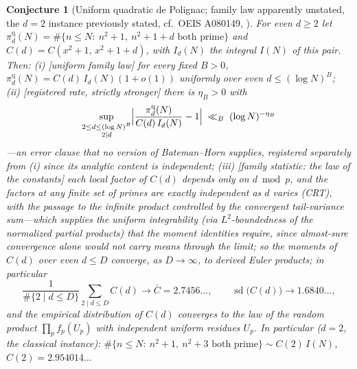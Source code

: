 \documentclass[11pt]{article}
\newtheorem{conjecture}{Conjecture}
\theoremstyle{definition}
\begin{document}
\setcounter{conjecture}{9}%
\begin{conjecture}[Uniform quadratic de Polignac; family law apparently
unstated, the $d=2$ instance previously stated, cf.\ OEIS A080149,
\cite{Carella}]\label{c1}
For even $d\ge2$ let
$\pi^{\mathrm q}_d(N)=\#\{n\le N:\ n^2+1,\ n^2+1+d \text{ both
prime}\}$ and $C(d)=C(x^2+1,\,x^2+1+d)$, with $I_d(N)$ the integral $I(N)$ of this pair.  Then:
\emph{(i)} [uniform family law] for every fixed $B>0$,
$\pi^{\mathrm q}_d(N)=C(d)\,I_d(N)(1+o(1))$ uniformly over even
$d\le(\log N)^{B}$;
\emph{(ii)} [registered rate, strictly stronger] there is
$\eta_B>0$ with
\[
\sup_{\substack{2\le d\le(\log N)^{B}\\ 2\mid d}}
\Bigl|\frac{\pi^{\mathrm q}_d(N)}{C(d)\,I_d(N)}-1\Bigr|
\;\ll_B\;(\log N)^{-\eta_B}
\]
---an error clause that no version of Bateman--Horn supplies, registered
separately from (i) since its analytic content is independent;
\emph{(iii)} [family statistic: the law of the constants]
each local factor of $C(d)$ depends only on $d\bmod p$, and the
factors at any \emph{finite} set of primes are exactly independent
as $d$ varies (CRT), with the passage to the infinite product
controlled by the convergent tail-variance sum---which supplies the
uniform integrability (via $L^2$-boundedness of the normalized
partial products) that the moment identities require, since
almost-sure convergence alone would not carry means through the
limit; so the moments of
$C(d)$ over even $d\le D$ converge, as $D\to\infty$, to
\emph{derived} Euler products; in particular
\[
\frac1{\#\{2\mid d\le D\}}\sum_{2\mid d\le D}C(d)\to\bar C=2.7456\ldots,
\qquad
\operatorname{sd}\bigl(C(d)\bigr)\to1.6840\ldots,
\]
and the empirical distribution of $C(d)$ converges to the law of the
random product $\prod_p f_p(U_p)$ with independent uniform residues
$U_p$.  In particular ($d=2$, the classical instance):
$\#\{n\le N:\ n^2+1,\ n^2+3 \text{ both prime}\}\sim C(2)\,I(N)$,
$C(2)=2.954014\ldots$
\end{conjecture}
\end{document}
